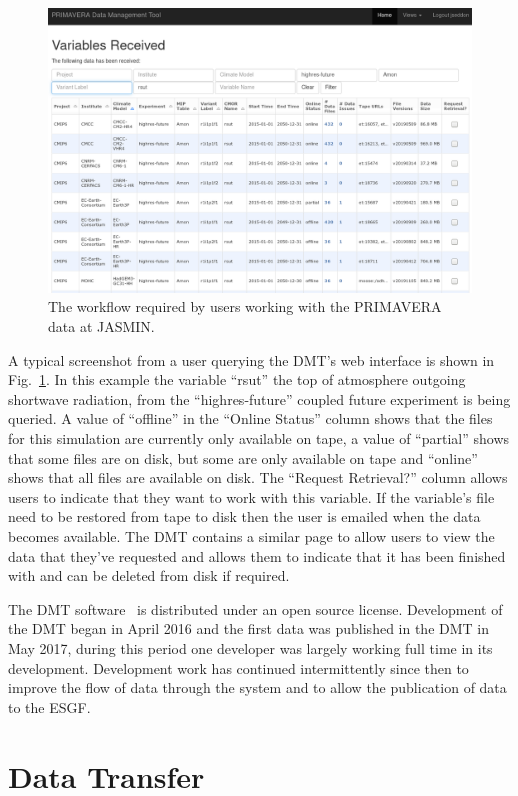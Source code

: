 \documentclass[gmd, manuscript]{copernicus}
\begin{document}
\begin{figure}[t]
	\includegraphics[width=12cm]{fig03.png}
	\caption{The workflow required by users working with the PRIMAVERA data at JASMIN.}
	\label{dmt_query}
\end{figure}

A typical screenshot from a user querying the DMT's web interface is shown in Fig.~\ref{dmt_query}. In this example the variable ``rsut'' the top of atmosphere outgoing shortwave radiation, from the ``highres-future'' coupled future experiment is being queried. A value of ``offline'' in the ``Online Status'' column shows that the files for this simulation are currently only available on tape, a value of ``partial'' shows that some files are on disk, but some are only available on tape and ``online'' shows that all files are available on disk. The ``Request Retrieval?'' column allows users to indicate that they want to work with this variable. If the variable's file need to be restored from tape to disk then the user is emailed when the data becomes available. The DMT contains a similar page to allow users to view the data that they've requested and allows them to indicate that it has been finished with and can be deleted from disk if required.

The DMT software~\citep{Seddon2019} is distributed under an open source license. Development of the DMT began in April 2016 and the first data was published in the DMT in May 2017, during this period one developer was largely working full time in its development. Development work has continued intermittently since then to improve the flow of data through the system and to allow the publication of data to the ESGF. 

\section{Data Transfer}
\label{transfer_rates}
\end{document}
